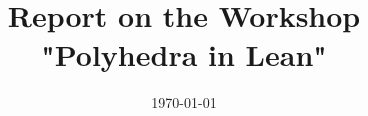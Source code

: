 \documentclass{article}
\begin{document}
\title{Report on the Workshop "Polyhedra in Lean"}

\date{\today}

\maketitle






\end{document}
